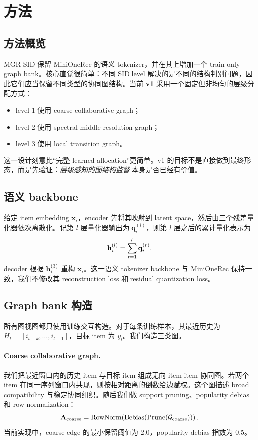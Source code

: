 \section{方法}
\label{sec:method}

\subsection{方法概览}

MGR-SID 保留 MiniOneRec 的语义 \rqvae{} tokenizer，并在其上增加一个 train-only graph bank。核心直觉很简单：不同 SID level 解决的是不同的结构判别问题，因此它们应当保留不同类型的协同图结构。当前 \textbf{v1} 采用一个固定但非均匀的层级分配方式：
\begin{itemize}[leftmargin=1.4em]
  \item level 1 使用 coarse collaborative graph；
  \item level 2 使用 spectral middle-resolution graph；
  \item level 3 使用 local transition graph。
\end{itemize}

这一设计刻意比“完整 learned allocation”更简单。v1 的目标不是直接做到最终形态，而是先验证：\emph{层级感知的图结构监督} 本身是否已经有价值。

\subsection{语义 backbone}

给定 item embedding $\mathbf{x}_i$，encoder 先将其映射到 latent space，然后由三个残差量化器依次离散化。记第 $l$ 层量化器输出为 $\mathbf{q}_i^{(l)}$，则第 $l$ 层之后的累计量化表示为
\begin{equation}
\mathbf{h}_i^{(l)} = \sum_{r=1}^{l} \mathbf{q}_i^{(r)}.
\end{equation}
decoder 根据 $\mathbf{h}_i^{(3)}$ 重构 $\mathbf{x}_i$。这一语义 tokenizer backbone 与 MiniOneRec 保持一致，我们不修改其 reconstruction loss 和 residual quantization loss。

\subsection{Graph bank 构造}

所有图视图都只使用训练交互构造。对于每条训练样本，其最近历史为 $H_t = [i_{t-k}, \dots, i_{t-1}]$，目标 item 为 $y_t$。我们构造三类图。

\paragraph{Coarse collaborative graph.}
我们把最近窗口内的历史 item 与目标 item 组成无向 item-item 协同图。若两个 item 在同一序列窗口内共现，则按相对距离的倒数给边赋权。这个图描述 broad compatibility 与稳定协同组织。随后我们做 support pruning、popularity debias 和 row normalization：
\begin{equation}
\mathbf{A}_{\mathrm{coarse}} = \mathrm{RowNorm}\!\left( \mathrm{Debias}\!\left( \mathrm{Prune}(\mathcal{G}_{\mathrm{coarse}}) \right)\right).
\end{equation}
当前实现中，coarse edge 的最小保留阈值为 $2.0$，popularity debias 指数为 $0.5$。

